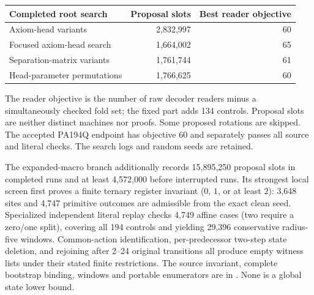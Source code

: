 \begin{center}\small
\begin{tabular}{@{}lrr@{}}\toprule
Completed root search & Proposal slots & Best reader objective\\\midrule
Axiom-head variants & 2,832,997 & 60\\
Focused axiom-head search & 1,664,002 & 65\\
Separation-matrix variants & 1,761,744 & 61\\
Head-parameter permutations & 1,766,625 & 60\\
\bottomrule\end{tabular}\end{center}
The reader objective is the number of raw decoder readers minus a simultaneously checked fold set; the fixed part adds 134 controls. Proposal slots are neither distinct machines nor proofs. Some proposed rotations are skipped. The accepted PA194Q endpoint has objective 60 and separately passes all source and literal checks. The search logs and random seeds are retained.


The expanded-macro branch additionally records 15,895,250 proposal slots
in completed runs and at least 4,572,000 before interrupted runs. Its
strongest local screen first proves a finite ternary register invariant
($0$, $1$, or at least $2$): 3,648 sites and 4,747 primitive outcomes are
admissible from the exact clean seed. Specialized independent literal
replay checks 4,749 affine cases (two require a zero/one split), covering
all 194 controls and yielding 29,396 conservative radius-five windows.
Common-action identification, per-predecessor two-step state deletion,
and rejoining after 2--24 original transitions all produce empty witness
lists under their stated finite restrictions. The source invariant,
complete bootstrap binding, windows and portable enumerators are in
. None is a global state lower bound.
